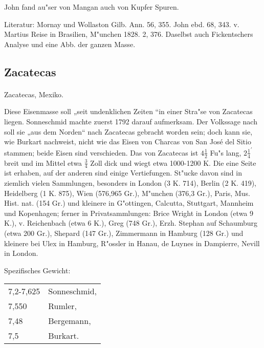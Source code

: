 \documentclass[a4paper, 11pt, oneside]{article}
\begin{document}
John fand au"ser von Mangan auch von Kupfer Spuren.

\footnotesize
Literatur: Mornay und Wollaston Gilb. Ann. 56, 355. John ebd. 68, 343. v. Martius Reise in Brasilien, M"unchen 1828. 2, 376. Daselbst auch Fickentschers Analyse und eine Abb. der ganzen Masse.

\subsection{Zacatecas}
\normalsize
\paragraph{}
Zacatecas, Mexiko.

Diese Eisenmasse soll „seit undenklichen Zeiten “in einer Stra"se von Zacatecas liegen. Sonneschmid machte zuerst 1792 darauf aufmerksam. Der Volkssage nach soll sie „aus dem Norden“ nach Zacatecas gebracht worden sein; doch kann sie, wie Burkart nachweist, nicht wie das Eisen von Charcas von San José del Sitio stammen; beide Eisen sind verschieden. Das von Zacatecas ist $4\frac{1}{2}$ Fu"s lang, $2\frac{1}{4}^\prime$ breit und im Mittel etwa $\frac{3}{4}$ Zoll dick und wiegt etwa 1000-1200 K. Die eine Seite ist erhaben, auf der anderen sind einige Vertiefungen. St"ucke davon sind in ziemlich vielen Sammlungen, besonders in London (3 K. 714), Berlin (2 K. 419), Heidelberg (1 K. 875), Wien (576,965 Gr.), M"unchen (376,3 Gr.), Paris, Mus. Hist. nat. (154 Gr.) und kleinere in G"ottingen, Calcutta, Stuttgart, Mannheim und Kopenhagen; ferner in Privatsammlungen: Brice Wright in London (etwa 9 K.), v. Reichenbach (etwa 6 K.), Greg (748 Gr.), Erzh. Stephan auf Schaumburg (etwa 200 Gr.), Shepard (147 Gr.), Zimmermann in Hamburg (128 Gr.) und kleinere bei Ulex in Hamburg, R"ossler in Hanau, de Luynes in Dampierre, Nevill in London.

Spezifisches Gewicht:  
\begin{table}[!ht]
    \centering
    \begin{tabular}{l l}
        7,2-7,625 & Sonneschmid,\\
        7,550 & Rumler,\\
        7,48 & Bergemann,\\
        7,5 & Burkart.
    \end{tabular}
\end{table}
\end{document}

